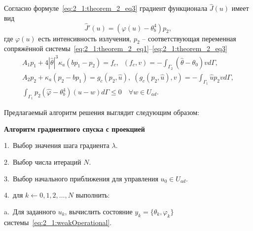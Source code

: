 Согласно формуле~\eqref{eq:2_1:theorem_2_eq3}
градиент функционала $\hat{J}(u)$ имеет вид
\[
    \hat{J}'(u)= (\varphi(u) -\theta_b^4)p_2,
\]
где $\varphi(u)$ есть интенсивность излучения,
$p_2$ -- соответствующая переменная сопряжённой
системы~\eqref{eq:2_1:theorem_2_eq1}--\eqref{eq:2_1:theorem_2_eq3}
\begin{gather*}
    A_1 p_1 + 4 |\hat{\theta}|^3 \kappa_a(b p_1 - p_2) = f_c,
    \;\; (f_c,v) = - \int_{\Gamma_2} (\hat{\theta} - \theta_0) v d\Gamma, \\
    A_2 p_2 + \kappa_a (p_2-b p_1) = g_c(p_2, \hat{u}),
    \;(g_c(p_2, \hat{u}), v) = -\int_{\Gamma_1} \hat{u} p_2 v d\Gamma, \\
    \int_{\Gamma_1} p_2 (\hat{\varphi} - \theta_b^4)(u-w) d\Gamma
    \leq 0 \quad \forall w \in U_{ad}.
\end{gather*}


Предлагаемый алгоритм решения выглядит следующим образом:


\textbf{Алгоритм градиентного спуска с проекцией}

1.\ Выбор значения шага градиента $\lambda$.

2.\ Выбор числа итераций $N$.

3.\ Выбор начального приближения для управления $u_0 \in U_{ad}$.

4.\ для $k \leftarrow 0,1,2, \ldots, N$ выполнить:

\hspace{1cm} a.\ Для заданного $u_{k}$, вычислить состояние $y_k = \{\theta_k, \varphi_k\}$
системы~\eqref{eq:2_1:weakOperational}.

